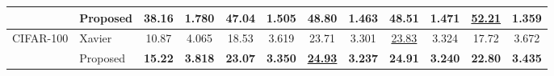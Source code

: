 \documentclass{article} \usepackage{iclr2025_conference,times}
\begin{document}
\begin{table}[b!]
{\begin{tabular}{ll cc cc cc cc cc}
                         & Proposed & \textbf{38.16} & \textbf{1.780} & \textbf{47.04} & \textbf{1.505} & \textbf{48.80}& \textbf{1.463} & \textbf{48.51} & \textbf{1.471} &\underline{\textbf{52.21}}&\textbf{1.359}\\
\midrule
\multirow{2}{*}{CIFAR-100} & Xavier & 10.87 & 4.065 & 18.53 & 3.619 & 23.71 & 3.301 & \underline{23.83} & 3.324 &17.72&3.672\\
                          & Proposed & \textbf{15.22} & \textbf{3.818} & \textbf{23.07} & \textbf{3.350} & \underline{\textbf{24.93}} & \textbf{3.237} & \textbf{24.91} & \textbf{3.240} &\textbf{22.80}&\textbf{3.435}\\
\bottomrule
\end{tabular}}
\end{table}
\end{document}
